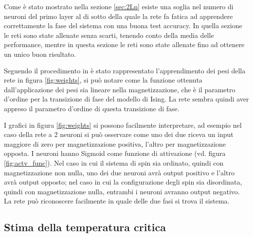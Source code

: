 \documentclass{article}
\begin{document}
Come è stato mostrato nella sezione \ref{sec:2Ln} esiste una soglia nel numero di neuroni del primo layer al di sotto della quale la rete fa fatica ad apprendere correttamente la fase del sistema con una buona test accuracy.
In quella sezione le reti sono state allenate senza scarti, tenendo conto della media delle performance, mentre in questa sezione le reti sono state allenate fino ad ottenere un unico buon risultato.

Seguendo il procedimento in \cite{carrasqu} è stato rappresentato l'apprendimento dei pesi della rete in figura \ref{fig:weights}, si può notare come la funzione ottenuta dall'applicazione dei pesi sia lineare nella magnetizzazione, che è il parametro d'ordine per la transizione di fase del modello di Ising.
La rete sembra quindi aver appreso il parametro d'ordine di questa transizione di fase.

I grafici in figura \ref{fig:weights} si possono facilmente interpretare, ad esempio nel caso della rete a 2 neuroni si può osservare come uno dei due riceva un input maggiore di zero per magnetizzazione positiva, l'altro per magnetizzazione opposta.
I neuroni hanno Sigmoid come funzione di attivazione (vd. figura \ref{fig:actv_func}).
Nel caso in cui il sistema di spin sia ordinato, quindi con magnetizzazione non nulla, uno dei due neuroni avrà output positivo e l'altro avrà output opposto; nel caso in cui la configurazione degli spin sia disordinata, quindi con magnetizzazione nulla, entrambi i neuroni avranno output negativo.
La rete può riconoscere facilmente in quale delle due fasi si trova il sistema.

\subsection{Stima della temperatura critica}
\end{document}
